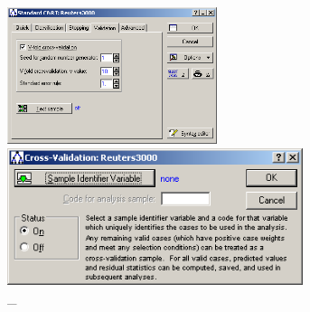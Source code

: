 \begin{figure}[!h]
  \centering

  \begin{minipage}{0.49\textwidth}
    \centering

    \includegraphics[height=4cm]
    {inc/27.PNG}

    \caption{\_}

    \label{fig:27}
  \end{minipage}
  \begin{minipage}{0.49\textwidth}
    \centering

    \includegraphics[height=4cm]
    {inc/28.PNG}

    \caption{\_}

    \label{fig:28}
  \end{minipage}
\end{figure}

